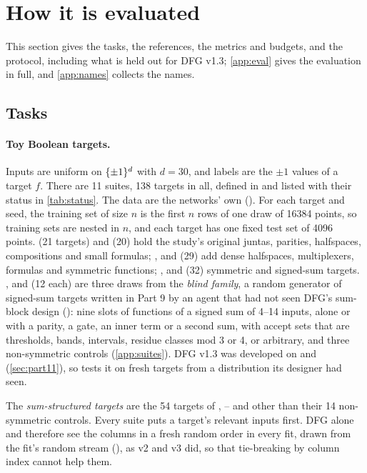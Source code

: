 \section{How it is evaluated}\label{sec:protocol}

This section gives the tasks, the references, the metrics and budgets, and the protocol, including what is held out for DFG v1.3; \cref{app:eval} gives the evaluation in full, and \cref{app:names} collects the names.

\subsection{Tasks}\label{sec:tasks}

\paragraph{Toy Boolean targets.} Inputs are uniform on $\{\pm1\}^d$ with $d=30$, and labels are the $\pm1$ values of a target $f$. There are 11 suites, 138 targets in all, defined in  and listed with their status in \cref{tab:status}. The data are the networks' own (). For each target and seed, the training set of size $n$ is the first $n$ rows of one draw of 16384 points, so training sets are nested in $n$, and each target has one fixed test set of 4096 points.  (21 targets) and  (20) hold the study's original juntas, parities, halfspaces, compositions and small formulas; ,  and  (29) add dense halfspaces, multiplexers, formulas and symmetric functions; ,  and  (32) symmetric and signed-sum targets. ,  and  (12 each) are three draws from the \emph{blind family}, a random generator of signed-sum targets written in Part 9 by an agent that had not seen DFG's sum-block design (): nine slots of functions of a signed sum of 4--14 inputs, alone or with a parity, a gate, an inner term or a second sum, with accept sets that are thresholds, bands, intervals, residue classes mod 3 or 4, or arbitrary, and three non-symmetric controls (\cref{app:suites}). DFG v1.3 was developed on  and  (\cref{sec:part11}), so  tests it on fresh targets from a distribution its designer had seen.

The \emph{sum-structured targets} are the 54 targets of , -- and  other than their 14 non-symmetric controls. Every suite puts a target's relevant inputs first. DFG alone and  therefore see the columns in a fresh random order in every fit, drawn from the fit's random stream (), as v2 and v3 did, so that tie-breaking by column index cannot help them.


